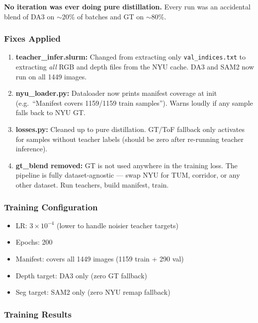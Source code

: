 \documentclass[11pt,a4paper]{article}
\begin{document}
\textbf{No iteration was ever doing pure distillation.} Every run was
an accidental blend of DA3 on $\sim$20\% of batches and GT on $\sim$80\%.

\subsubsection{Fixes Applied}

\begin{enumerate}[nosep]
  \item \textbf{teacher\_infer.slurm:} Changed from extracting only
    \texttt{val\_indices.txt} to extracting \emph{all} RGB and depth
    files from the NYU cache. DA3 and SAM2 now run on all 1449 images.

  \item \textbf{nyu\_loader.py:} Dataloader now prints manifest coverage
    at init (e.g.\ ``Manifest covers 1159/1159 train samples''). Warns
    loudly if any sample falls back to NYU GT.

  \item \textbf{losses.py:} Cleaned up to pure distillation. GT/ToF
    fallback only activates for samples without teacher labels (should
    be zero after re-running teacher inference).

  \item \textbf{gt\_blend removed:} GT is not used anywhere in the
    training loss. The pipeline is fully dataset-agnostic --- swap NYU
    for TUM, corridor, or any other dataset. Run teachers, build
    manifest, train.
\end{enumerate}

\subsubsection{Training Configuration}

\begin{itemize}[nosep]
  \item LR: $3 \times 10^{-4}$ (lower to handle noisier teacher targets)
  \item Epochs: 200
  \item Manifest: covers all 1449 images (1159 train + 290 val)
  \item Depth target: DA3 only (zero GT fallback)
  \item Seg target: SAM2 only (zero NYU remap fallback)
\end{itemize}

\subsubsection{Training Results}
\end{document}
